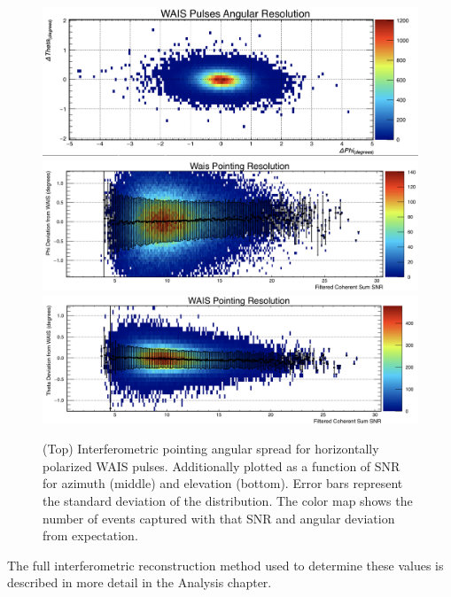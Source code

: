 	\begin{figure}
		\centering
		\includegraphics[width=\textwidth]{figures/waisResolution}
		\includegraphics[width=\textwidth]{figures/waisPhiResolution}
		\includegraphics[width=\textwidth]{figures/waisThetaResolution}	
		\caption{(Top) Interferometric pointing angular spread for horizontally polarized WAIS pulses.  Additionally plotted as a function of SNR for azimuth (middle) and elevation (bottom).  Error bars represent the standard deviation of the distribution.  The color map shows the number of events captured with that SNR and angular deviation from expectation.}
	\label{fig:pointingAccuracy}
	\end{figure}
	
	The full interferometric reconstruction method used to determine these values is described in more detail in the Analysis chapter.
	
